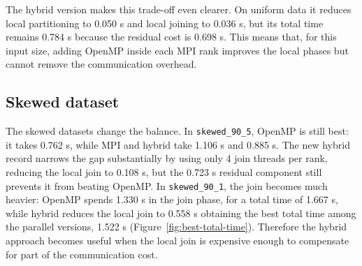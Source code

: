 \documentclass[11pt,a4paper]{article}
\begin{document}
The hybrid version makes this trade-off even clearer.  On uniform data it reduces local partitioning to 0.050 s and local joining to 0.036 s, but its total time remains 0.784 s because the residual cost is 0.698 s.  This means that, for this input size, adding OpenMP inside each MPI rank improves the local phases but cannot remove the communication overhead.

\subsection{Skewed dataset}

The skewed datasets change the balance.  In \texttt{skewed\_90\_5}, OpenMP is still best: it takes 0.762 s, while MPI and hybrid take 1.106 s and 0.885 s.  The new hybrid record narrows the gap substantially by using only 4 join threads per rank, reducing the local join to 0.108 s, but the 0.723 s residual component still prevents it from beating OpenMP.  In \texttt{skewed\_90\_1}, the join becomes much heavier: OpenMP spends 1.330 s in the join phase, for a total time of 1.667 s, while hybrid reduces the local join to 0.558 s obtaining the best total time among the parallel versions, 1.522 s (Figure~\ref{fig:best-total-time}).  Therefore the hybrid approach becomes useful when the local join is expensive enough to compensate for part of the communication cost.
\end{document}
